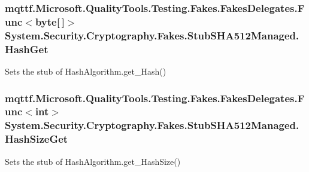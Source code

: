 \hypertarget{class_system_1_1_security_1_1_cryptography_1_1_fakes_1_1_stub_s_h_a512_managed_a5c650bbc82b8839d0ab0e9fd199296c5}{
\subsubsection[{Hash\-Get}]{\setlength{\rightskip}{0pt plus 5cm}mqttf.\-Microsoft.\-Quality\-Tools.\-Testing.\-Fakes.\-Fakes\-Delegates.\-Func$<$byte\mbox{[}$\,$\mbox{]}$>$ System.\-Security.\-Cryptography.\-Fakes.\-Stub\-S\-H\-A512\-Managed.\-Hash\-Get}}\label{class_system_1_1_security_1_1_cryptography_1_1_fakes_1_1_stub_s_h_a512_managed_a5c650bbc82b8839d0ab0e9fd199296c5}


Sets the stub of Hash\-Algorithm.\-get\-\_\-\-Hash()

\hypertarget{class_system_1_1_security_1_1_cryptography_1_1_fakes_1_1_stub_s_h_a512_managed_a7a8196cc7239713d9d8c2e526e75ad1e}{
\subsubsection[{Hash\-Size\-Get}]{\setlength{\rightskip}{0pt plus 5cm}mqttf.\-Microsoft.\-Quality\-Tools.\-Testing.\-Fakes.\-Fakes\-Delegates.\-Func$<$int$>$ System.\-Security.\-Cryptography.\-Fakes.\-Stub\-S\-H\-A512\-Managed.\-Hash\-Size\-Get}}\label{class_system_1_1_security_1_1_cryptography_1_1_fakes_1_1_stub_s_h_a512_managed_a7a8196cc7239713d9d8c2e526e75ad1e}


Sets the stub of Hash\-Algorithm.\-get\-\_\-\-Hash\-Size()

